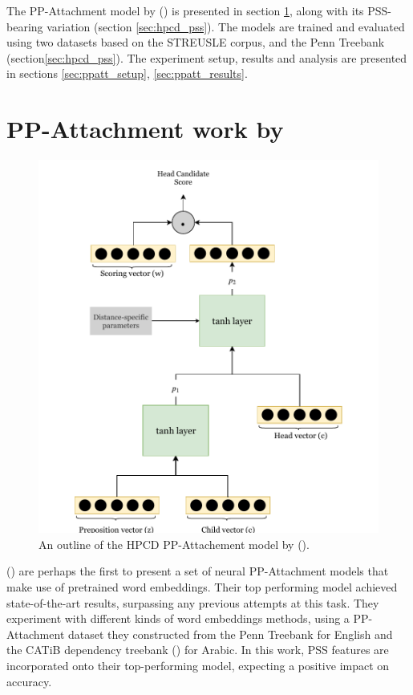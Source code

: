 The PP-Attachment model by (\cite{hpcd}) is presented in section \ref{sec:ppatt-belinkov}, along with its PSS-bearing variation (section \ref{sec:hpcd_pss}). The models are trained and evaluated using two datasets based on the STREUSLE corpus, and the Penn Treebank (section\ref{sec:hpcd_pss}). The experiment setup, results and analysis are presented in sections \ref{sec:ppatt_setup}, \ref{sec:ppatt_results}.

\section{PP-Attachment work by \cite{hpcd}} \label{sec:ppatt-belinkov}

\begin{figure}
    \centering\small
    \includegraphics[width=\textwidth]{Figures/hpcd.pdf}
    \caption{An outline of the HPCD PP-Attachement model by (\cite{hpcd}).}
    \label{fig:hpcd}
\end{figure}

(\cite{hpcd}) are perhaps the first to present a set of neural PP-Attachment models that make use of pretrained word embeddings. Their top performing model achieved state-of-the-art results, surpassing any previous attempts at this task. They experiment with different kinds of word embeddings methods, using a PP-Attachment dataset they constructed from the Penn Treebank for English and the CATiB dependency treebank (\cite{habash09mada}) for Arabic. In this work, PSS features are incorporated onto their top-performing model, expecting a positive impact on accuracy. 

